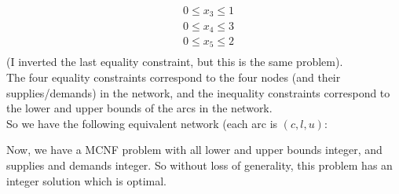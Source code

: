 \documentclass[12pt]{article}
\begin{document}
\begin{enumerate}
\begin{equation}
\begin{split}
        &0\leq x_3\leq1\\
        &0\leq x_4\leq3\\
        &0\leq x_5\leq2\\
      \end{split}
    \end{equation}
    (I inverted the last equality constraint, but this is the same problem).\\
    The four equality constraints correspond to the four nodes (and their supplies/demands)
    in the network, and the inequality constraints correspond to the lower and upper bounds
    of the arcs in the network.\\
    So we have the following equivalent network (each arc is $(c,l,u)$:\\
    \begin{center}
    \end{center}

    Now, we have a MCNF problem with all lower and upper bounds integer, and supplies
    and demands integer. So without loss of generality, this problem has an integer
    solution which is optimal.\\
\end{enumerate}
\end{document}
